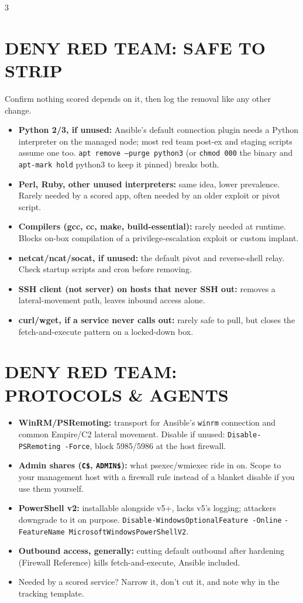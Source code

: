 \documentclass[7pt,landscape]{article}
\begin{document}
\begin{multicols*}{3}
\section{DENY RED TEAM: SAFE TO STRIP}
Confirm nothing scored depends on it, then log the removal like any other change.
\begin{itemize}
    \item \textbf{Python 2/3, if unused:} Ansible's default connection plugin needs a Python interpreter on the managed node; most red team post-ex and staging scripts assume one too. \texttt{apt remove --purge python3} (or \texttt{chmod 000} the binary and \texttt{apt-mark hold} python3 to keep it pinned) breaks both.
    \item \textbf{Perl, Ruby, other unused interpreters:} same idea, lower prevalence. Rarely needed by a scored app, often needed by an older exploit or pivot script.
    \item \textbf{Compilers (gcc, cc, make, build-essential):} rarely needed at runtime. Blocks on-box compilation of a privilege-escalation exploit or custom implant.
    \item \textbf{netcat/ncat/socat, if unused:} the default pivot and reverse-shell relay. Check startup scripts and cron before removing.
    \item \textbf{SSH client (not server) on hosts that never SSH out:} removes a lateral-movement path, leaves inbound access alone.
    \item \textbf{curl/wget, if a service never calls out:} rarely safe to pull, but closes the fetch-and-execute pattern on a locked-down box.
\end{itemize}

\section{DENY RED TEAM: PROTOCOLS \& AGENTS}
\begin{itemize}
    \item \textbf{WinRM/PSRemoting:} transport for Ansible's \texttt{winrm} connection and common Empire/C2 lateral movement. Disable if unused: \texttt{Disable-PSRemoting -Force}, block 5985/5986 at the host firewall.
    \item \textbf{Admin shares (\texttt{C\$}, \texttt{ADMIN\$}):} what psexec/wmiexec ride in on. Scope to your management host with a firewall rule instead of a blanket disable if you use them yourself.
    \item \textbf{PowerShell v2:} installable alongside v5+, lacks v5's logging; attackers downgrade to it on purpose. \texttt{Disable-WindowsOptionalFeature -Online} \newline \texttt{-FeatureName MicrosoftWindowsPowerShellV2}.
    \item \textbf{Outbound access, generally:} cutting default outbound after hardening (Firewall Reference) kills fetch-and-execute, Ansible included.
    \item Needed by a scored service? Narrow it, don't cut it, and note why in the tracking template.
\end{itemize}


\end{multicols*}
\end{document}
